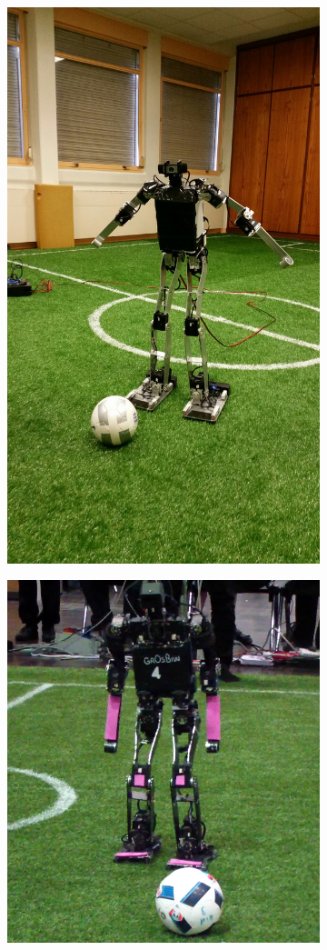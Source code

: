 \begin{figure}[htb]
    \centerfloat
    \begin{subfigure}{0.35\paperwidth}
        \centering
        \includegraphics[width=0.7\linewidth]{../media/grosban_1_0.jpg}
    \end{subfigure}
    \begin{subfigure}{0.35\paperwidth}
        \centering
        \includegraphics[width=1.0\linewidth]{../media/grosban_1_1.png}

\end{subfigure}
\end{figure}
